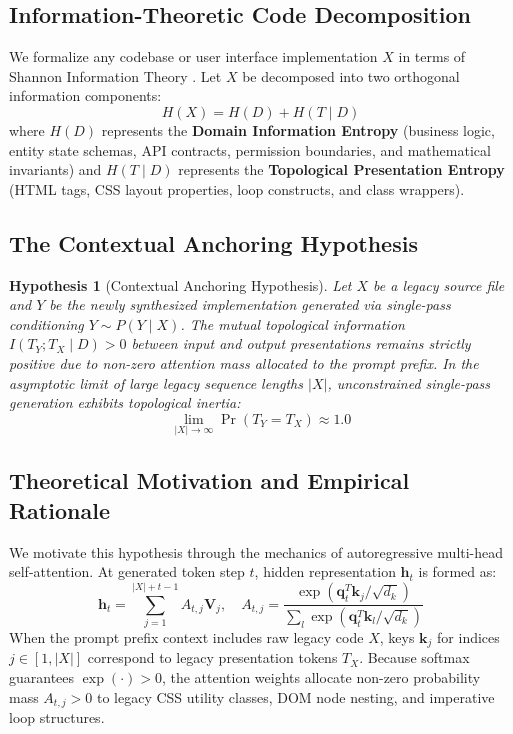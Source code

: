 \documentclass[10pt,journal,compsoc]{IEEEtran}
\newtheorem{hypothesis}{Hypothesis}
\begin{document}
\subsection{Information-Theoretic Code Decomposition}
We formalize any codebase or user interface implementation $X$ in terms of Shannon Information Theory \cite{shannon1948mathematical}. Let $X$ be decomposed into two orthogonal information components:
\begin{equation}
H(X) = H(D) + H(T \mid D)
\label{eq:entropy}
\end{equation}
where $H(D)$ represents the \textbf{Domain Information Entropy} (business logic, entity state schemas, API contracts, permission boundaries, and mathematical invariants) and $H(T \mid D)$ represents the \textbf{Topological Presentation Entropy} (HTML tags, CSS layout properties, loop constructs, and class wrappers).

\subsection{The Contextual Anchoring Hypothesis}

\begin{hypothesis}[Contextual Anchoring Hypothesis]
Let $X$ be a legacy source file and $Y$ be the newly synthesized implementation generated via single-pass conditioning $Y \sim P(Y \mid X)$. The mutual topological information $I(T_Y ; T_X \mid D) > 0$ between input and output presentations remains strictly positive due to non-zero attention mass allocated to the prompt prefix. In the asymptotic limit of large legacy sequence lengths $|X|$, unconstrained single-pass generation exhibits topological inertia:
\begin{equation}
\lim_{|X| \to \infty} \Pr(T_Y = T_X) \approx 1.0
\end{equation}
\end{hypothesis}

\subsection{Theoretical Motivation and Empirical Rationale}
We motivate this hypothesis through the mechanics of autoregressive multi-head self-attention. At generated token step $t$, hidden representation $\mathbf{h}_t$ is formed as:
\begin{equation}
\mathbf{h}_t = \sum_{j=1}^{|X| + t - 1} A_{t,j} \mathbf{V}_j, \quad A_{t,j} = \frac{\exp(\mathbf{q}_t^T \mathbf{k}_j / \sqrt{d_k})}{\sum_{l} \exp(\mathbf{q}_t^T \mathbf{k}_l / \sqrt{d_k})}
\end{equation}
When the prompt prefix context includes raw legacy code $X$, keys $\mathbf{k}_j$ for indices $j \in [1, |X|]$ correspond to legacy presentation tokens $T_X$. Because softmax guarantees $\exp(\cdot) > 0$, the attention weights allocate non-zero probability mass $A_{t,j} > 0$ to legacy CSS utility classes, DOM node nesting, and imperative loop structures.
\end{document}
